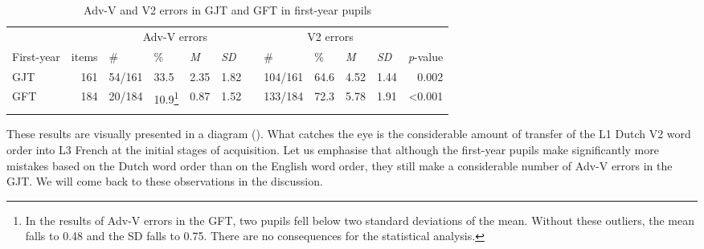 \documentclass[output=paper,modfonts,nonflat, newtxmath]{langsci/langscibook}
\begin{document}
\begin{table}
\caption{Adv-V and V2 errors in GJT and GFT in first-year pupils}
\label{tab:stadt:4}
\footnotesize
\begin{tabularx}{0.93\textwidth}{p{1.3cm} r p{0.5cm} p{0.5cm} p{0.5cm} p{0.5cm} p{0.0001cm} p{0.7cm }p{0.3cm} p{0.3cm} p{0.3cm} r}
	\lsptoprule
&  &   \multicolumn{4}{c}{Adv-V errors} & &  \multicolumn{4}{c}{V2 errors} & \\
First-year & items & \# & \% & \textit{M} & \textit{SD}&  & \# & \% & \textit{M} & \textit{SD} & \textit{p}-value\\
\cmidrule{3-6}  \cmidrule{8-11}
GJT & 161 & 54/161 & 33.5 & 2.35 & 1.82 & & 104/161 & 64.6 & 4.52 & 1.44 & 0.002\\
GFT & 184 & 20/184 & 10.9\footnote{In the results of Adv-V errors in the GFT, two pupils fell below two standard deviations of the mean. Without these outliers, the mean falls to 0.48 and the SD falls to 0.75. There are no consequences for the statistical analysis.} & 0.87 & 1.52 & & 133/184 & 72.3 & 5.78 & 1.91 & <0.001\\
\lspbottomrule
\end{tabularx}
\end{table}

These results are visually presented in a diagram (). What catches the eye is the considerable amount of transfer of the L1 Dutch V2 word order into L3 French at the initial stages of acquisition. Let us emphasise that although the first-year pupils make significantly more mistakes based on the Dutch word order than on the English word order, they still make a considerable number of Adv-V errors in the GJT. We will come back to these observations in the discussion.
\end{document}
